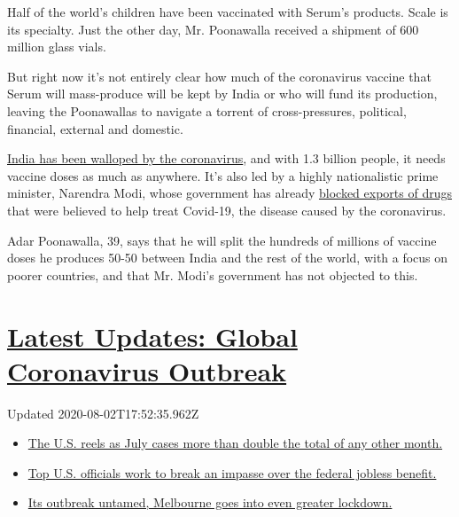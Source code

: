 Half of the world's children have been vaccinated with Serum's products.
Scale is its specialty. Just the other day, Mr. Poonawalla received a
shipment of 600 million glass vials.

But right now it's not entirely clear how much of the coronavirus
vaccine that Serum will mass-produce will be kept by India or who will
fund its production, leaving the Poonawallas to navigate a torrent of
cross-pressures, political, financial, external and domestic.

\href{https://www.nytimes3xbfgragh.onion/2020/07/16/world/asia/coronavirus-india-million-cases.html}{India
has been walloped by the coronavirus}, and with 1.3 billion people, it
needs vaccine doses as much as anywhere. It's also led by a highly
nationalistic prime minister, Narendra Modi, whose government has
already
\href{https://www.nytimes3xbfgragh.onion/2020/03/03/business/coronavirus-india-drugs.html}{blocked
exports of drugs} that were believed to help treat Covid-19, the disease
caused by the coronavirus.

Adar Poonawalla, 39, says that he will split the hundreds of millions of
vaccine doses he produces 50-50 between India and the rest of the world,
with a focus on poorer countries, and that Mr. Modi's government has not
objected to this.

\hypertarget{latest-updates-global-coronavirus-outbreak}{%
\section{\texorpdfstring{\href{https://www.nytimes3xbfgragh.onion/2020/08/01/world/coronavirus-covid-19.html?action=click\&pgtype=Article\&state=default\&region=MAIN_CONTENT_1\&context=storylines_live_updates}{Latest
Updates: Global Coronavirus
Outbreak}}{Latest Updates: Global Coronavirus Outbreak}}\label{latest-updates-global-coronavirus-outbreak}}

Updated 2020-08-02T17:52:35.962Z

\begin{itemize}
\tightlist
\item
  \href{https://www.nytimes3xbfgragh.onion/2020/08/01/world/coronavirus-covid-19.html?action=click\&pgtype=Article\&state=default\&region=MAIN_CONTENT_1\&context=storylines_live_updates\#link-34047410}{The
  U.S. reels as July cases more than double the total of any other
  month.}
\item
  \href{https://www.nytimes3xbfgragh.onion/2020/08/01/world/coronavirus-covid-19.html?action=click\&pgtype=Article\&state=default\&region=MAIN_CONTENT_1\&context=storylines_live_updates\#link-780ec966}{Top
  U.S. officials work to break an impasse over the federal jobless
  benefit.}
\item
  \href{https://www.nytimes3xbfgragh.onion/2020/08/01/world/coronavirus-covid-19.html?action=click\&pgtype=Article\&state=default\&region=MAIN_CONTENT_1\&context=storylines_live_updates\#link-2bc8948}{Its
  outbreak untamed, Melbourne goes into even greater lockdown.}
\end{itemize}

